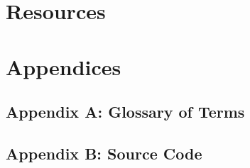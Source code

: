 
\chapter{Resources}

\nocite{*}



\chapter{Appendices}

\section{Appendix A: Glossary of Terms}
\label{sec:glosterm}

%

\section{Appendix B: Source Code}
\label{sec:srccode}


